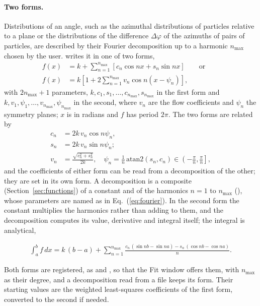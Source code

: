 \paragraph{Two forms.}
Distributions of an angle, such as the azimuthal distributions of particles relative to a plane or the distributions
of the difference $\Delta\varphi$ of the azimuths of pairs of particles, are described by their Fourier
decomposition up to a harmonic $n_{\max}$ chosen by the user.  writes it in one of two
forms,
\begin{align}
  \label{eq:fourier}
  f(x) &= k + \sum_{n=1}^{n_{\max}} \left[c_n \cos nx + s_n \sin nx\right]
  \qquad\text{or}\qquad \\
  f(x) &= k\left[1 + 2\sum_{n=1}^{n_{\max}} v_n \cos n(x - \psi_n)\right],
\end{align}
with $2n_{\max} + 1$ parameters, $k, c_1, s_1, \dots, c_{n_{\max}}, s_{n_{\max}}$ in the first form and
$k, v_1, \psi_1, \dots, v_{n_{\max}}, \psi_{n_{\max}}$ in the second, where $v_n$ are the flow coefficients and
$\psi_n$ the symmetry planes; $x$ is in radians and $f$ has period $2\pi$. The two forms are related by
\begin{align}
  c_n &= 2k\, v_n \cos n\psi_n, \quad \\
  s_n &= 2k\, v_n \sin n\psi_n; \qquad \\
  v_n &= \frac{\sqrt{c_n^2 + s_n^2}}{2k}, \quad \psi_n = \frac{1}{n}\,\mathrm{atan2}(s_n, c_n) \in \left(-\frac{\pi}{n}, \frac{\pi}{n}\right],
\end{align}
and the coefficients of either form can be read from a decomposition of the other; they are set in its own form.
A decomposition is a composite (Section~\ref{sec:functions}) of a constant and of the harmonics $n = 1$ to
$n_{\max}$ (), whose parameters are named as in Eq.~(\ref{eq:fourier}). In the second form the
constant multiplies the harmonics rather than adding to them, and the decomposition computes its value, derivative
and integral itself; the integral is analytical,
\begin{widetext}
\begin{align}
  \int_a^b f\, dx = k\,(b-a) + \sum_{n=1}^{n_{\max}} \frac{c_n\,(\sin nb - \sin na) - s_n\,(\cos nb - \cos na)}{n}.
\end{align}
\end{widetext}
Both forms are registered, as  and , so that the Fit window offers
them, with $n_{\max}$ as their degree, and a decomposition read from a file keeps its form. Their starting values are
the weighted least-squares coefficients of the first form, converted to the second if needed.

